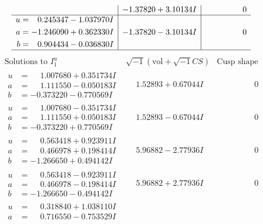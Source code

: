 \documentclass[1p]{elsarticle_modified}
\theoremstyle{definition}
\newcommand{\I}{\sqrt{-1}}
\begin{document}
$$\begin{array}{c|c|c}
 & -1.37820 + 3.10134 I & \phantom{-0.000000 } 0 \\ \hline\begin{aligned}
u &= \phantom{-}0.245347 - 1.037970 I \\
a &= -1.246090 + 0.362330 I \\
b &= \phantom{-}0.904434 - 0.036830 I\end{aligned}
 & -1.37820 - 3.10134 I & \phantom{-0.000000 } 0\\
 \hline 
 \end{array}$$\newpage$$\begin{array}{c|c|c}  
\text{Solutions to }I^u_{1}& \I (\text{vol} + \sqrt{-1}CS) & \text{Cusp shape}\\
 \hline 
\begin{aligned}
u &= \phantom{-}1.007680 + 0.351734 I \\
a &= \phantom{-}1.111550 - 0.050183 I \\
b &= -0.373220 - 0.770569 I\end{aligned}
 & \phantom{-}1.52893 + 0.67044 I & \phantom{-0.000000 } 0 \\ \hline\begin{aligned}
u &= \phantom{-}1.007680 - 0.351734 I \\
a &= \phantom{-}1.111550 + 0.050183 I \\
b &= -0.373220 + 0.770569 I\end{aligned}
 & \phantom{-}1.52893 - 0.67044 I & \phantom{-0.000000 } 0 \\ \hline\begin{aligned}
u &= \phantom{-}0.563418 + 0.923911 I \\
a &= \phantom{-}0.466978 + 0.198414 I \\
b &= -1.266650 + 0.494142 I\end{aligned}
 & \phantom{-}5.96882 - 2.77936 I & \phantom{-0.000000 } 0 \\ \hline\begin{aligned}
u &= \phantom{-}0.563418 - 0.923911 I \\
a &= \phantom{-}0.466978 - 0.198414 I \\
b &= -1.266650 - 0.494142 I\end{aligned}
 & \phantom{-}5.96882 + 2.77936 I & \phantom{-0.000000 } 0 \\ \hline\begin{aligned}
u &= \phantom{-}0.318840 + 1.038110 I \\
a &= \phantom{-}0.716550 - 0.753529 I \\

\end{aligned}
\end{array}$$
\end{document}

